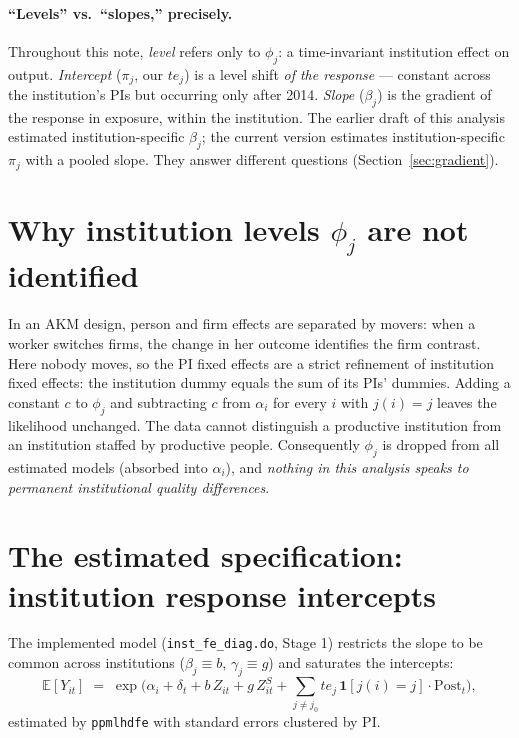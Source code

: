 \documentclass[11pt]{article}
\newcommand{\E}{\mathbb{E}}
\newcommand{\Post}{\mathrm{Post}}
\begin{document}
\paragraph{``Levels'' vs.\ ``slopes,'' precisely.}
Throughout this note, \emph{level} refers only to $\phi_j$: a time-invariant
institution effect on output. \emph{Intercept} ($\pi_j$, our $te_j$) is a
level shift \emph{of the response} --- constant across the institution's PIs
but occurring only after 2014. \emph{Slope} ($\beta_j$) is the gradient of
the response in exposure, within the institution. The earlier draft of this
analysis estimated institution-specific $\beta_j$; the current version
estimates institution-specific $\pi_j$ with a pooled slope. They answer
different questions (Section~\ref{sec:gradient}).

\section{Why institution levels $\phi_j$ are not identified}

In an AKM design, person and firm effects are separated by movers: when a
worker switches firms, the change in her outcome identifies the firm
contrast. Here nobody moves, so the PI fixed effects are a strict refinement
of institution fixed effects: the institution dummy equals the sum of its
PIs' dummies. Adding a constant $c$ to $\phi_j$ and subtracting $c$ from
$\alpha_i$ for every $i$ with $j(i)=j$ leaves the likelihood unchanged. The
data cannot distinguish a productive institution from an institution staffed
by productive people. Consequently $\phi_j$ is dropped from all estimated
models (absorbed into $\alpha_i$), and \emph{nothing in this analysis speaks
to permanent institutional quality differences}.

\section{The estimated specification: institution response intercepts}
\label{sec:main}

The implemented model (\texttt{inst\_fe\_diag.do}, Stage 1) restricts the
slope to be common across institutions ($\beta_j \equiv b$, $\gamma_j \equiv
g$) and saturates the intercepts:
\begin{equation}
\E[Y_{it}] \;=\; \exp\Big( \alpha_i + \delta_t + b\, Z_{it} + g\, Z^{S}_{it}
+ \sum_{j \ne j_0} te_j \, \mathbf{1}[j(i)=j] \cdot \Post_t \Big),
\label{eq:main}
\end{equation}
estimated by \texttt{ppmlhdfe} with standard errors clustered by PI.
\end{document}
